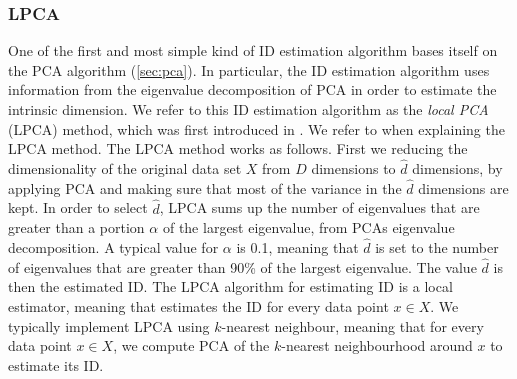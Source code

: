 \subsubsection{LPCA}
\label{sec:id-estimation-lpca}
One of the first and most simple kind of ID estimation algorithm bases itself on the PCA algorithm (\cref{sec:pca}). In particular, the ID estimation algorithm uses information from the eigenvalue decomposition of PCA in order to estimate the intrinsic dimension. We refer to this ID estimation algorithm as the \textit{local PCA} (LPCA) method, which was first introduced in \cite{Fukunaga1971}. We refer to \cite{Fukunaga1971} when explaining the LPCA method. The LPCA method works as follows. First we reducing the dimensionality of the original data set $X$ from $D$ dimensions to $\hat{d}$ dimensions, by applying PCA and making sure that most of the variance in the $\hat{d}$ dimensions are kept. In order to select $\hat{d}$, LPCA sums up the number of eigenvalues that are greater than a portion $\alpha$ of the largest eigenvalue, from PCAs eigenvalue decomposition. A typical value for $\alpha$ is 0.1, meaning that $\hat{d}$ is set to the number of eigenvalues that are greater than 90\% of the largest eigenvalue. The value $\hat{d}$ is then the estimated ID. The LPCA algorithm for estimating ID is a local estimator, meaning that estimates the ID for every data point $x \in X$. We typically implement LPCA using $k$-nearest neighbour, meaning that for every data point $x \in X$, we compute PCA of the $k$-nearest neighbourhood around $x$ to estimate its ID.

